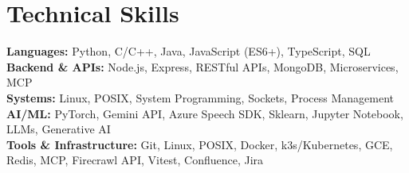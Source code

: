\section{Technical Skills}
 \begin{itemize}[leftmargin=0.15in, label={}]
    \small{
        \item{
            \textbf{Languages: }{Python, C/C++, Java, JavaScript (ES6+), TypeScript, SQL} \\
            \textbf{Backend \& APIs: }{Node.js, Express, RESTful APIs, MongoDB, Microservices, MCP} \\
            \textbf{Systems: }{Linux, POSIX, System Programming, Sockets, Process Management} \\
            \textbf{AI/ML: }{PyTorch, Gemini API, Azure Speech SDK, Sklearn, Jupyter Notebook, LLMs, Generative AI} \\
            \textbf{Tools \& Infrastructure: }{Git, Linux, POSIX, Docker, k3s/Kubernetes, GCE, Redis, MCP, Firecrawl API, Vitest, Confluence, Jira}
        }
    }
 \end{itemize}
